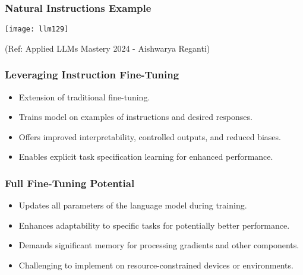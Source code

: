 \begin{frame}[fragile]\frametitle{Natural Instructions Example}

\begin{center}
\texttt{[image: llm129]}
\end{center}				

{\tiny (Ref: Applied LLMs Mastery 2024 - Aishwarya Reganti)}

\end{frame}

\begin{frame}[fragile]\frametitle{Leveraging Instruction Fine-Tuning}
    \begin{itemize}
        \item Extension of traditional fine-tuning.
        \item Trains model on examples of instructions and desired responses.
        \item Offers improved interpretability, controlled outputs, and reduced biases.
        \item Enables explicit task specification learning for enhanced performance.
    \end{itemize}
\end{frame}

\begin{frame}[fragile]\frametitle{Full Fine-Tuning Potential}
    \begin{itemize}
        \item Updates all parameters of the language model during training.
        \item Enhances adaptability to specific tasks for potentially better performance.
        \item Demands significant memory for processing gradients and other components.
        \item Challenging to implement on resource-constrained devices or environments.
    \end{itemize}
\end{frame}

